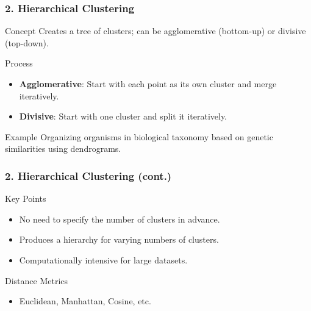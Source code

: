 \documentclass[aspectratio=169]{beamer}
\begin{document}
\begin{frame}[fragile]
    \frametitle{2. Hierarchical Clustering}
    \begin{block}{Concept}
        Creates a tree of clusters; can be agglomerative (bottom-up) or divisive (top-down).
    \end{block}
    \begin{block}{Process}
        \begin{itemize}
            \item \textbf{Agglomerative}: Start with each point as its own cluster and merge iteratively.
            \item \textbf{Divisive}: Start with one cluster and split it iteratively.
        \end{itemize}
    \end{block}
    \begin{block}{Example}
        Organizing organisms in biological taxonomy based on genetic similarities using dendrograms.
    \end{block}
\end{frame}

\begin{frame}[fragile]
    \frametitle{2. Hierarchical Clustering (cont.)}
    \begin{block}{Key Points}
        \begin{itemize}
            \item No need to specify the number of clusters in advance.
            \item Produces a hierarchy for varying numbers of clusters.
            \item Computationally intensive for large datasets.
        \end{itemize}
    \end{block}
    \begin{block}{Distance Metrics}
        \begin{itemize}
            \item Euclidean, Manhattan, Cosine, etc.
        \end{itemize}
    \end{block}
\end{frame}
\end{document}
